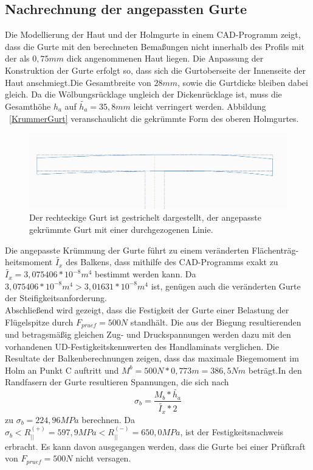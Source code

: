 \subsection{Nachrechnung der angepassten Gurte}
 Die Modellierung der Haut und der Holmgurte in einem CAD-Programm zeigt, dass die Gurte mit den berechneten Bemaßungen nicht innerhalb des Profils mit der als $ 0,75mm $ dick angenommenen Haut liegen. Die Anpassung der Konstruktion der Gurte erfolgt so, dass sich die Gurtoberseite der Innenseite der Haut anschmiegt.Die Gesamtbreite von $ 28mm $, sowie die Gurtdicke bleiben dabei gleich. Da die Wölbungsrücklage ungleich der Dickenrücklage ist, muss die Gesamthöhe $ h_{a} $ auf $ \tilde{h_{a}}=35,8mm $ leicht verringert werden. Abbildung ~\ref{KrummerGurt} veranschaulicht die gekrümmte Form des oberen Holmgurtes.\\
 \begin{figure}
 	\includegraphics[width=1.0\textwidth]{Bilder/KrummerGurt.jpg}
 	\caption{Der rechteckige Gurt ist gestrichelt dargestellt, der angepasste gekrümmte Gurt mit einer durchgezogenen Linie.}
 	\label{fig: KrummerGurt}
 \end{figure}

\noindent Die angepasste Krümmung der Gurte führt zu einem veränderten Flächenträg-heitsmoment $ \tilde{I_{x}} $ des Balkens, dass mithilfe des CAD-Programms exakt zu $ \tilde{I_{x}}=3,075406*10^{-8}m^{4} $ bestimmt werden kann. Da $ 3,075406*10^{-8}m^{4} > 3,01631*10^{-8}m^{4} $ ist, genügen auch die veränderten Gurte der Steifigkeitsanforderung.\\
 
\noindent Abschließend wird gezeigt, dass die Festigkeit der Gurte einer Belastung der Flügelspitze durch $ F_{pruef}=500N $ standhält. Die aus der Biegung resultierenden und betragsmäßig gleichen Zug- und Druckspannungen werden dazu mit den vorhandenen UD-Festigkeitskennwerten des Handlaminats verglichen. Die Resultate der Balkenberechnungen zeigen, dass das maximale Biegemoment im Holm an Punkt C auftritt und $ M^{b}=500N*0,773m=386,5Nm $ beträgt.In den Randfasern der Gurte resultieren Spannungen, die sich nach\\
\begin{equation}
	\sigma_{b}=\frac{M_{b}*\tilde{h_{a}}}{\tilde{I_{x}}*2}
\end{equation} 
zu $ \sigma_{b}=224,96MPa $ berechnen. Da $ \sigma_{b}< R^{(+)}_{||}=597,9 MPa < R^{(-)}_{||}=650,0 MPa $, ist der Festigkeitsnachweis erbracht. Es kann davon ausgegangen werden, dass die Gurte bei einer Prüfkraft von $ F_{pruef}=500N $ nicht versagen. \\

